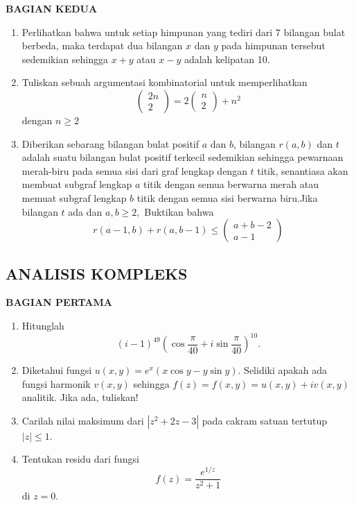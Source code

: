 \documentclass[12pt,twoside]{article}
\begin{document}
\newpage \textbf{BAGIAN KEDUA}
\begin{enumerate}
	\item Perlihatkan bahwa untuk setiap himpunan yang tediri dari 7 bilangan bulat berbeda, maka terdapat dua bilangan $x$ dan $y$ pada himpunan tersebut sedemikian sehingga $x+y$ atau $x-y $ adalah kelipatan 10.

	\item Tuliskan sebuah argumentasi kombinatorial untuk memperlihatkan
	      \begin{equation*}
		      \left( \begin{array}{c}
			      2n \\2
		      \end{array} \right) = 2 \left( \begin{array}{c}
			      n \\2
		      \end{array} \right) +n^2
	      \end{equation*}
	      dengan $n \geq 2$

	\item Diberikan sebarang bilangan bulat positif $a$ dan $b$, bilangan $r(a,b)$ dan $t$ adalah suatu bilangan bulat positif terkecil sedemikian sehingga pewarnaan merah-biru pada semua sisi dari graf lengkap dengan $t$ titik, senantiasa akan membuat subgraf lengkap $a$ titik dengan semua berwarna merah atau memuat subgraf lengkap $b$ titik dengan semua sisi berwarna biru.Jika bilangan $t$ ada dan $a,b \geq 2,$ Buktikan bahwa
	      \begin{equation*}
		      r(a-1,b)+r(a,b-1) \leq \left( \begin{array}{c}
			      a+b-2 \\a-1
		      \end{array} \right)
	      \end{equation*}
\end{enumerate}
\pagebreak
\subsection{ANALISIS KOMPLEKS}
\textbf{BAGIAN PERTAMA}
\begin{enumerate}
	\item Hitunglah
	      \begin{equation*}
		      (i-1)^{49}\left( \cos\dfrac{\pi}{40}+i\sin\dfrac{\pi}{40} \right)^{10}.
	      \end{equation*}

	\item Diketahui fungsi $u(x,y) = e^x(x\cos y - y \sin y)$. Selidiki apakah ada fungsi harmonik $v(x,y)$ sehingga $f(z) =  f(x,y) = u(x,y)+iv(x,y)$ analitik. Jika ada, tuliskan!\\

	\item Carilah nilai maksimum dari $|z^2 + 2z -3|$ pada cakram satuan tertutup $|z| \leq 1$.

	\item Tentukan residu dari fungsi
	      \begin{equation*}
		      f(z) = \dfrac{e^{1/z}}{z^2+1}
	      \end{equation*}
	      di $z = 0$.
\end{enumerate}
\end{document}
